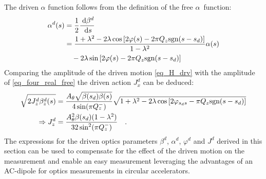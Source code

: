 %
The driven $\alpha$ function follows from the definition of the free $\alpha$~function:
\begin{align}
  \alpha^d(s) &=  \frac{1}{2}\frac{\;\text{d} \beta^d}{\;\text{d} s}\notag \\
  &= 
  \frac{1+\lambda^2-2\lambda\cos\left[ 2\varphi(s) - 2\pi Q_z\text{sgn}(s-s_d)\right]}{1-\lambda^2}
  \alpha(s) \notag \\
  &\quad- 2\lambda \sin\left[ 2\varphi(s) - 2\pi Q_z\text{sgn}(s-s_d) \right]
  \label{eq_drv_alpha}
\end{align}
%
Comparing the amplitude of the driven motion \eqref{eq_H_drv} with the amplitude of \eqref{eq_four_real_free}
the driven action $J_x^d$ can be deduced:
%
\begin{align}
  \sqrt{2J_z^d\beta_z^d(s)} &= 
  \frac{A_\theta\sqrt{\beta(s_d)\beta(s)}}{4\sin(\pi Q_z^-)}
  \sqrt{1+\lambda^2-2\lambda\cos\left[2\varphi_{s_ds} - \pi Q_z\text{sgn}(s-s_d)\right]} \notag \\
  \Rightarrow J_z^d &=  \frac{A_\theta^2\beta(s_d)(1-\lambda^2)}{32 \sin^2(\pi Q_z^-)}
  \quad .
  \label{eq_drv_Jy}
\end{align}
%
The expressions for the driven optics parameters $\beta^d$, $\alpha^d$, $\varphi^d$ and $J^d$ derived
in this section can be used to compensate for the effect of the driven motion on the measurement and enable
an easy measurement leveraging the advantages of an AC-dipole for optics measurements in circular
accelerators.

